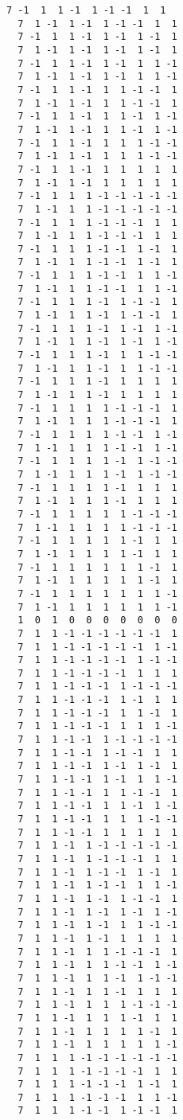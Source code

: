 \documentclass[%
 showpacs,
 showkeys,
 preprintnumbers,
 amsmath,amssymb,
 aps,
  pra,
  longbibliography,
 floatfix,
 ]{revtex4-1}
\begin{document}
{\begin{lstlisting}[backgroundcolor=\color{yellow!10},framerule=0pt,breaklines=true, frame=tb]
  7 -1  1  1 -1  1 -1 -1  1  1
  7  1 -1  1 -1  1 -1 -1  1  1
  7 -1  1  1 -1  1 -1  1 -1  1
  7  1 -1  1 -1  1 -1  1 -1  1
  7 -1  1  1 -1  1 -1  1  1 -1
  7  1 -1  1 -1  1 -1  1  1 -1
  7 -1  1  1 -1  1  1 -1 -1  1
  7  1 -1  1 -1  1  1 -1 -1  1
  7 -1  1  1 -1  1  1 -1  1 -1
  7  1 -1  1 -1  1  1 -1  1 -1
  7 -1  1  1 -1  1  1  1 -1 -1
  7  1 -1  1 -1  1  1  1 -1 -1
  7 -1  1  1 -1  1  1  1  1  1
  7  1 -1  1 -1  1  1  1  1  1
  7 -1  1  1  1 -1 -1 -1 -1 -1
  7  1 -1  1  1 -1 -1 -1 -1 -1
  7 -1  1  1  1 -1 -1 -1  1  1
  7  1 -1  1  1 -1 -1 -1  1  1
  7 -1  1  1  1 -1 -1  1 -1  1
  7  1 -1  1  1 -1 -1  1 -1  1
  7 -1  1  1  1 -1 -1  1  1 -1
  7  1 -1  1  1 -1 -1  1  1 -1
  7 -1  1  1  1 -1  1 -1 -1  1
  7  1 -1  1  1 -1  1 -1 -1  1
  7 -1  1  1  1 -1  1 -1  1 -1
  7  1 -1  1  1 -1  1 -1  1 -1
  7 -1  1  1  1 -1  1  1 -1 -1
  7  1 -1  1  1 -1  1  1 -1 -1
  7 -1  1  1  1 -1  1  1  1  1
  7  1 -1  1  1 -1  1  1  1  1
  7 -1  1  1  1  1 -1 -1 -1  1
  7  1 -1  1  1  1 -1 -1 -1  1
  7 -1  1  1  1  1 -1 -1  1 -1
  7  1 -1  1  1  1 -1 -1  1 -1
  7 -1  1  1  1  1 -1  1 -1 -1
  7  1 -1  1  1  1 -1  1 -1 -1
  7 -1  1  1  1  1 -1  1  1  1
  7  1 -1  1  1  1 -1  1  1  1
  7 -1  1  1  1  1  1 -1 -1 -1
  7  1 -1  1  1  1  1 -1 -1 -1
  7 -1  1  1  1  1  1 -1  1  1
  7  1 -1  1  1  1  1 -1  1  1
  7 -1  1  1  1  1  1  1 -1  1
  7  1 -1  1  1  1  1  1 -1  1
  7 -1  1  1  1  1  1  1  1 -1
  7  1 -1  1  1  1  1  1  1 -1
  1  0  1  0  0  0  0  0  0  0
  7  1  1 -1 -1 -1 -1 -1 -1  1
  7  1  1 -1 -1 -1 -1 -1  1 -1
  7  1  1 -1 -1 -1 -1  1 -1 -1
  7  1  1 -1 -1 -1 -1  1  1  1
  7  1  1 -1 -1 -1  1 -1 -1 -1
  7  1  1 -1 -1 -1  1 -1  1  1
  7  1  1 -1 -1 -1  1  1 -1  1
  7  1  1 -1 -1 -1  1  1  1 -1
  7  1  1 -1 -1  1 -1 -1 -1 -1
  7  1  1 -1 -1  1 -1 -1  1  1
  7  1  1 -1 -1  1 -1  1 -1  1
  7  1  1 -1 -1  1 -1  1  1 -1
  7  1  1 -1 -1  1  1 -1 -1  1
  7  1  1 -1 -1  1  1 -1  1 -1
  7  1  1 -1 -1  1  1  1 -1 -1
  7  1  1 -1 -1  1  1  1  1  1
  7  1  1 -1  1 -1 -1 -1 -1 -1
  7  1  1 -1  1 -1 -1 -1  1  1
  7  1  1 -1  1 -1 -1  1 -1  1
  7  1  1 -1  1 -1 -1  1  1 -1
  7  1  1 -1  1 -1  1 -1 -1  1
  7  1  1 -1  1 -1  1 -1  1 -1
  7  1  1 -1  1 -1  1  1 -1 -1
  7  1  1 -1  1 -1  1  1  1  1
  7  1  1 -1  1  1 -1 -1 -1  1
  7  1  1 -1  1  1 -1 -1  1 -1
  7  1  1 -1  1  1 -1  1 -1 -1
  7  1  1 -1  1  1 -1  1  1  1
  7  1  1 -1  1  1  1 -1 -1 -1
  7  1  1 -1  1  1  1 -1  1  1
  7  1  1 -1  1  1  1  1 -1  1
  7  1  1 -1  1  1  1  1  1 -1
  7  1  1  1 -1 -1 -1 -1 -1 -1
  7  1  1  1 -1 -1 -1 -1  1  1
  7  1  1  1 -1 -1 -1  1 -1  1
  7  1  1  1 -1 -1 -1  1  1 -1
  7  1  1  1 -1 -1  1 -1 -1  1

\end{lstlisting}}
\end{document}
